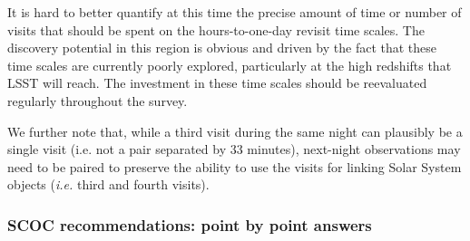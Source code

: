 It is hard to better quantify at this time the precise amount of time or number of visits that should be spent on the hours-to-one-day revisit time scales. The discovery potential in this region is obvious and driven by the fact that these time scales are currently poorly explored, particularly at the high redshifts that LSST will reach. The investment in these time scales should be reevaluated regularly throughout the survey. 

We further note that, while a third visit during the same night can plausibly be a single visit (i.e. not a pair separated by 33 minutes), next-night observations may need to be paired to preserve the ability to use the visits for linking Solar System objects (\emph{i.e.} third and fourth visits).

\subsubsection{SCOC recommendations: point by point answers}\label{rec:intranight}

